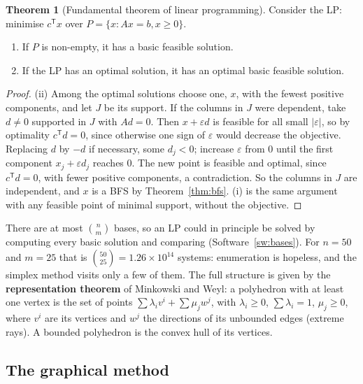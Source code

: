 \documentclass[11pt,a4paper]{article}
\numberwithin{equation}{section}
\theoremstyle{definition}
\newtheorem{thm}{Theorem}[subsection]
\begin{document}
\begin{thm}[Fundamental theorem of linear programming]
\label{thm:fundamental}
Consider the LP: minimise $c^{\mathsf T}x$ over $P = \{x : Ax = b, x \geq 0\}$.
\begin{enumerate}[label=(\roman*)]
\item If $P$ is non-empty, it has a basic feasible solution.
\item If the LP has an optimal solution, it has an optimal basic feasible solution.
\end{enumerate}
\end{thm}

\begin{proof}
(ii) Among the optimal solutions choose one, $x$, with the fewest positive components, and let $J$ be its support. If the columns in $J$ were dependent, take $d \neq 0$ supported in $J$ with $Ad = 0$. Then $x + \varepsilon d$ is feasible for all small $|\varepsilon|$, so by optimality $c^{\mathsf T}d = 0$,
since otherwise one sign of $\varepsilon$ would decrease the objective. Replacing $d$ by $-d$ if necessary, some $d_j < 0$; increase $\varepsilon$ from $0$ until the first component $x_j + \varepsilon d_j$ reaches $0$. The new point is feasible and optimal, since $c^{\mathsf T}d = 0$, with fewer positive components,
a contradiction. So the columns in $J$ are independent, and $x$ is a BFS by Theorem~\ref{thm:bfs}. (i) is the same argument with any feasible point of minimal support, without the objective.
\end{proof}

There are at most $\binom nm$ bases, so an LP could in principle be solved by computing every basic solution and comparing (Software~\ref{sw:bases}). For $n = 50$ and $m = 25$ that is $\binom{50}{25} = 1.26 \times 10^{14}$ systems: enumeration is hopeless, and the simplex method visits only a few of them. The full structure is given by
the \textbf{representation theorem} of Minkowski and Weyl: a polyhedron with at least one vertex is the set of points $\sum\lambda_iv^i + \sum\mu_jw^j$, with $\lambda_i \geq 0$, $\sum\lambda_i = 1$, $\mu_j \geq 0$, where $v^i$ are its vertices and $w^j$ the directions of its unbounded edges (extreme rays). A bounded polyhedron is the convex hull of
its vertices.

\subsection{The graphical method}
\label{ssec:graphical}
\end{document}
